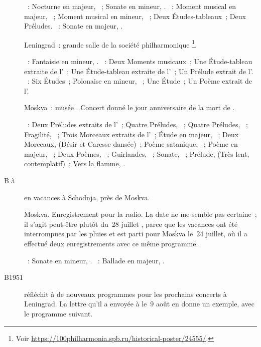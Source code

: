 \begin{description}
 \textsc{\Chopin{}}~: Nocturne en \kD \Flat majeur,  ~;
 Sonate en \kB mineur, .
 \textsc{\Rachmaninov{}}~: Moment musical en \kD \Flat majeur, 
 ~; Moment musical en \kE \Flat mineur,  ~;
 Deux Études-tableaux~; Deux Préludes.
 \textsc{\Scriabine{}}~: Sonate en \kF \Sharp majeur, .
 \item[\DateWithWeekDay{1951-04-03}]
 Leningrad~: grande salle de la société philharmonique%
 \footnote{Voir
 \href{https://100philharmonia.spb.ru/historical-poster/24555/}%
 {https://100philharmonia.spb.ru/historical-poster/24555/}.}.

 \textsc{\Chopin{}}~: Fantaisie en \kF mineur, .
 \textsc{\Rachmaninov{}}~: Deux Moments musicaux~; Une Étude-tableau
 extraite de l'~; Une Étude-tableau extraite de l'~; Un
 Prélude extrait de l'.
 \textsc{\Scriabine{}}~: Six Études~; Polonaise en \kB \Flat mineur,
 ~; Une Étude~; Un Poème extrait de l'.
 \item[\DateWithWeekDay{1951-04-27}]
 Moskva~: musée \Scriabine{}.
 Concert donné le jour anniversaire de la mort de \Scriabine{}.

 \textsc{\Scriabine{}}~: Deux Préludes extraits de l'~; Quatre
 Préludes, ~; Quatre Préludes, ~; Fragilité, 
 ~; Trois Morceaux extraits de l'~; Étude en \kE \Flat
 majeur,  ~; Deux Morceaux,  (Désir et Caresse
 dansée)~; Poème satanique, ~; Poème en \kC majeur, 
 ~; Deux Poèmes, ~; Guirlandes,  ~;
 Sonate, ~; Prélude,   (Très lent,
 contemplatif)~; Vers la flamme, .
 \item[B\DateWithWeekDay{1951-07-18} à \DateWithWeekDay{1951-08-14}]
 \VSofronitsky{} en vacances à Schodnja, près de Moskva.
 \item[\DateWithWeekDay{1951-08-28}]
 Moskva.
 Enregistrement pour la radio.
 La date ne me semble pas certaine~; il s'agit peut-être plutôt du~28
 juillet \citep[voir][p.~171]{Nekrasova08}, parce que les vacances ont été
 interrompues par les pluies et \Sofronitsky{} est parti pour Moskva le~24
 juillet, où il a effectué deux enregistrements avec ce même programme.

 \textsc{\Beethoven{}}~: Sonate en \kC mineur, .
 \textsc{\Chopin{}}~: Ballade en \kA \Flat majeur, .
 \item[B1951]
 \VSofronitsky{} réfléchit à de nouveaux programmes pour les prochains
 concerts à Leningrad.
 La lettre qu'il a envoyée à \AVizel{} le~9 août \citep[p.~171]{Nekrasova08}
 en donne un exemple, avec le programme suivant.


\end{description}
